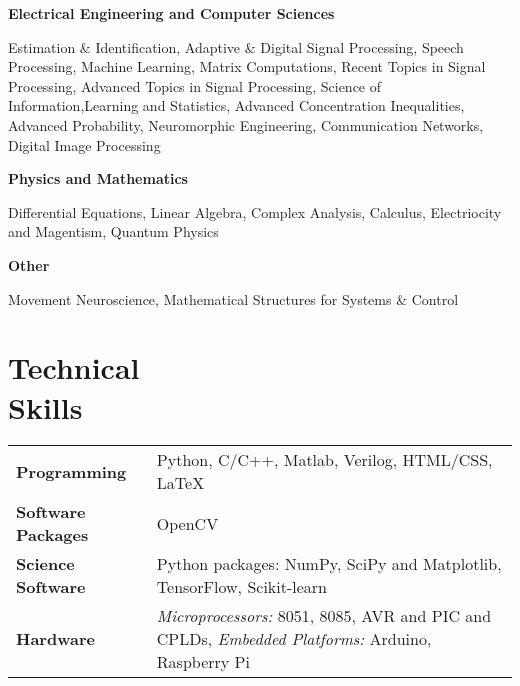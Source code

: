 \documentclass[margin,line, 9pt]{res}
\newenvironment{list1}{
  \begin{list}{\ding{113}}{%
      \setlength{\itemsep}{0in}
      \setlength{\parsep}{0in} \setlength{\parskip}{0in}
      \setlength{\topsep}{0in} \setlength{\partopsep}{0in} 
      \setlength{\leftmargin}{0.17in}}}{\end{list}}
\begin{document}
\begin{resume}
\begin{list1}
\item[\strut\hspace{0.5cm}\hypertarget{crselst}{\textbf{Electrical Engineering and Computer Sciences}}]
\item[]Estimation \& Identification, Adaptive \& Digital Signal Processing, Speech Processing, Machine Learning, Matrix Computations, Recent Topics in Signal Processing, Advanced Topics in Signal Processing, Science of Information,Learning and Statistics, Advanced Concentration Inequalities, Advanced Probability, Neuromorphic Engineering, Communication Networks, Digital Image Processing
\vspace{0.05in}
\item[\strut\hspace{0.5cm}\textbf{Physics and Mathematics}]
\vspace{0.05in}
\item[]Differential Equations, Linear Algebra, Complex Analysis, Calculus, Electriocity and Magentism, Quantum Physics
\item[\strut\hspace{0.5cm}\textbf{Other}]
\vspace{0.05in}
\item[]Movement Neuroscience, Mathematical Structures for Systems \& Control

\end{list1}

\section{\sc Technical \\Skills} 
\begin{tabular}{@{}p{1.3in}p{4.3in}}
\textbf{Programming} & Python, C/C++, Matlab, Verilog, HTML/CSS, \LaTeX \\  
\vspace*{-0.06in}
\textbf{Software Packages} & 
\vspace*{-0.06in} OpenCV \\ 
\vspace*{-0.06in}
\textbf{Science Software} &
\vspace*{-0.06in}
Python packages: NumPy, SciPy and Matplotlib, TensorFlow, Scikit-learn \\
\vspace*{-0.06in}
\textbf{Hardware} &
\vspace*{-0.06in}
\textit{Microprocessors:} 8051, 8085, AVR and PIC and CPLDs, \textit{Embedded Platforms:} Arduino, Raspberry Pi \\     
\end{tabular}


\end{resume}
\end{document}
